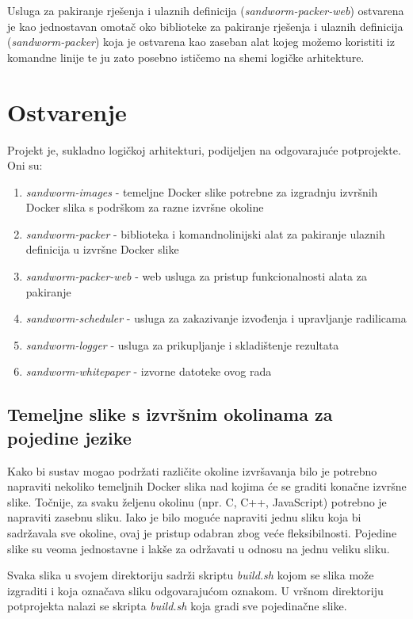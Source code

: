 \documentclass[times, utf8, zavrsni]{fer}
\begin{document}
Usluga za pakiranje rješenja i ulaznih definicija ({\textit{sandworm-packer-web}}) ostvarena je kao jednostavan omotač oko biblioteke za pakiranje rješenja i ulaznih definicija ({\textit{sandworm-packer}}) koja je ostvarena kao zaseban alat kojeg možemo koristiti iz komandne linije te ju zato posebno ističemo na shemi logičke arhitekture.


\section{Ostvarenje}
\label{sec:implementation}

Projekt je, sukladno logičkoj arhitekturi, podijeljen na odgovarajuće potprojekte. Oni su:

\begin{enumerate}
\item {\textit{sandworm-images}} - temeljne Docker slike potrebne za izgradnju izvršnih Docker slika s podrškom za razne izvršne okoline
\item {\textit{sandworm-packer}} - biblioteka i komandnolinijski alat za pakiranje ulaznih definicija u izvršne Docker slike
\item {\textit{sandworm-packer-web}} - web usluga za pristup funkcionalnosti alata za pakiranje
\item {\textit{sandworm-scheduler}} - usluga za zakazivanje izvođenja i upravljanje radilicama
\item {\textit{sandworm-logger}} - usluga za prikupljanje i skladištenje rezultata
\item {\textit{sandworm-whitepaper}} - izvorne datoteke ovog rada
\end{enumerate}


\subsection{Temeljne slike s izvršnim okolinama za pojedine jezike}

Kako bi sustav mogao podržati različite okoline izvršavanja bilo je potrebno napraviti nekoliko temeljnih Docker slika nad kojima će se graditi konačne izvršne slike. Točnije, za svaku željenu okolinu (npr. C, C++, JavaScript) potrebno je napraviti zasebnu sliku. Iako je bilo moguće napraviti jednu sliku koja bi sadržavala sve okoline, ovaj je pristup odabran zbog veće fleksibilnosti. Pojedine slike su veoma jednostavne i lakše za održavati u odnosu na jednu veliku sliku.

Svaka slika u svojem direktoriju sadrži skriptu {\textit{build.sh}} kojom se slika može izgraditi i koja označava sliku odgovarajućom oznakom. U vršnom direktoriju potprojekta nalazi se skripta {\textit{build.sh}} koja gradi sve pojedinačne slike.
\end{document}
